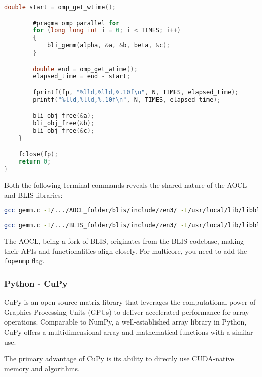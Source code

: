 \begin{lstlisting}[language=C]
        double start = omp_get_wtime();

        #pragma omp parallel for
        for (long long int i = 0; i < TIMES; i++)
        {
            bli_gemm(alpha, &a, &b, beta, &c);
        }

        double end = omp_get_wtime();
        elapsed_time = end - start;

        fprintf(fp, "%lld,%lld,%.10f\n", N, TIMES, elapsed_time);
        printf("%lld,%lld,%.10f\n", N, TIMES, elapsed_time);

        bli_obj_free(&a);
        bli_obj_free(&b);
        bli_obj_free(&c);
    }

    fclose(fp);
    return 0;
}
\end{lstlisting}

Both the following terminal commands reveals the shared nature of the AOCL and BLIS libraries:

\begin{lstlisting}[language=bash]
gcc gemm.c -I/.../AOCL_folder/blis/include/zen3/ -L/usr/local/lib/libblis.so -lblis -lm -lpthread -o gemm.x
\end{lstlisting}

\begin{lstlisting}[language=bash]
gcc gemm.c -I/.../BLIS_folder/blis/include/zen3/ -L/usr/local/lib/libblis.so -lblis -lm -lpthread -o gemm.x
\end{lstlisting}

The AOCL, being a fork of BLIS, originates from the BLIS codebase, making their APIs and functionalities align closely. For multicore, you need to add the \texttt{-fopenmp} flag.


\subsubsection{Python - CuPy}

CuPy is an open-source matrix library that leverages the computational power of Graphics Processing Units (GPUs) to deliver accelerated performance for array operations. Comparable to NumPy, a well-established array library in Python, CuPy offers a multidimensional array and mathematical functions with a similar use.

The primary advantage of CuPy is its ability to directly use CUDA-native memory and algorithms.

